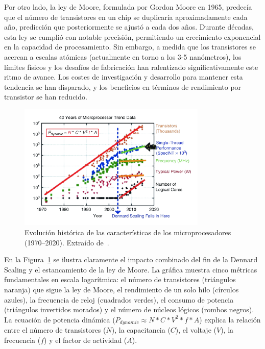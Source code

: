\documentclass[11pt,spanish,listoffigures,listoftables]{tfgetsinf}
\begin{document}
Por otro lado, la ley de Moore\cite{moore1965cramming}, formulada por Gordon Moore en 1965, predecía que el número de transistores en un chip se duplicaría aproximadamente cada año, predicción que posteriormente se ajustó a cada dos años. Durante décadas, esta ley se cumplió con notable precisión, permitiendo un crecimiento exponencial en la capacidad de procesamiento. Sin embargo, a medida que los transistores se acercan a escalas atómicas (actualmente en torno a los 3-5 nanómetros), los límites físicos y los desafíos de fabricación han ralentizado significativamente este ritmo de avance. Los costes de investigación y desarrollo para mantener esta tendencia se han disparado, y los beneficios en términos de rendimiento por transistor se han reducido.

\begin{figure}[H]
   \centering
   \includegraphics[width=0.8\textwidth]{images/estado_del_arte/dennard_scaling.png}
   \caption[Evolución histórica de las características de los microprocesadores (1970--2020)]{Evolución histórica de las características de los microprocesadores (1970--2020). Extraído de~\cite[p.~8]{ConteRebootingComputing}.}
   \label{fig:dennard_scaling}
\end{figure}

En la Figura~\ref{fig:dennard_scaling} se ilustra claramente el impacto combinado del fin de la Dennard Scaling y el estancamiento de la ley de Moore. La gráfica muestra cinco métricas fundamentales en escala logarítmica: el número de transistores (triángulos naranja) que sigue la ley de Moore, el rendimiento de un solo hilo (círculos azules), la frecuencia de reloj (cuadrados verdes), el consumo de potencia (triángulos invertidos morados) y el número de núcleos lógicos (rombos negros). La ecuación de potencia dinámica ($P_{dynamic} \approx N * C * V^2 * f * A$) explica la relación entre el número de transistores ($N$), la capacitancia ($C$), el voltaje ($V$), la frecuencia ($f$) y el factor de actividad ($A$).
\end{document}
